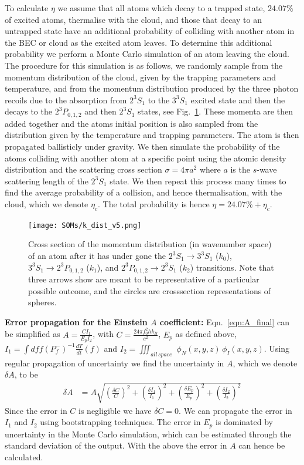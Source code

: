 \documentclass[%
 amsmath,amssymb,
aps,
]{revtex4-2}
\newcommand{\UpperState}{3^{3\!}S_1}%
\newcommand{\MetastableState}{2^{3\!}S_1}%
\newcommand{\MidState}{2^{3\!}P_{0,1,2}}%
\begin{document}
To calculate \(\eta\) we assume that all atoms which decay to a trapped state, \(24.07\%\) of excited atoms, thermalise with the cloud, and those that decay to an untrapped state have an additional probability of colliding with another atom in the BEC or cloud as the excited atom leaves. To determine this additional probability we perform a Monte Carlo simulation of an atom leaving the cloud. The procedure for this simulation is as follows, we randomly sample from the momentum distribution of the cloud, given by the trapping parameters and temperature, and from the momentum distribution produced by the three photon recoils due to the absorption from \(\MetastableState\) to the \(\UpperState\) excited state and then the decays to the \(\MidState\) and then \(\MetastableState\) states, see Fig.~\ref{fig:k_dist}. These momenta are then added together and the atoms initial position is also sampled from the distribution given by the temperature and trapping parameters. The atom is then propagated ballisticly under gravity. We then simulate the probability of the atoms colliding with another atom at a specific point using the atomic density distribution and the scattering cross section \(\sigma = 4 \pi a^2\) where \(a\) is the \(s\)-wave scattering length of the \(\MetastableState\) state. We then repeat this process many times to find the average probability of a collision, and hence thermalisation, with the cloud, which we denote \(\eta_c\). The total probability is hence \(\eta = 24.07\% + \eta_c\).

\begin{figure}
    \centering
    \texttt{[image: SOMs/k\_dist\_v5.png]}
    \caption{Cross section of the momentum distribution (in wavenumber space) of an atom after it has under gone the \(\MetastableState \rightarrow \UpperState\) (\(k_0\)), \(\UpperState \rightarrow \MidState\) (\(k_1\)), and \(\MidState \rightarrow \MetastableState\) (\(k_2\)) transitions. Note that three arrows show are meant to be representative of a particular possible outcome, and the circles are crosssection representations of spheres.}
    \label{fig:k_dist}
\end{figure}

\textbf{Error propagation for the Einstein \(A\) coefficient:} 
Eqn.~\ref{eqn:A_final} can be simplified as \(A=\frac{C I_1}{E_p I_2}\), with \(C=\frac{24 \pi f_0^2 h k_B}{c^2}\), \(E_p\) as defined above, \(I_1 = \int df f \left(P_{f}^-\right)^{-1} \frac{dT}{dt}(f)\) and \(I_2 = \iiint_{all\, space} \,  \, \phi_N(x,y,z) \, \phi_I(x,y,z)\).
Using regular propagation of uncertainty we find the uncertainty in \(A\), which we denote \(\delta A\), to be
\begin{align}
    \delta A &= A \sqrt{\left(\frac{\delta C}{C}\right)^2 + \left(\frac{\delta I_1}{I_1}\right)^2 + \left(\frac{\delta E_p}{E_p}\right)^2 + \left(\frac{\delta I_2}{I_2}\right)^2 }
\end{align}
Since the error in \(C\) is negligible we have \(\delta C =0\). We can propagate the error in \(I_1\) and \(I_2\) using bootstrapping techniques. The error in \(E_p\) is dominated by uncertainty in the Monte Carlo simulation, which can be estimated through the standard deviation of the output. With the above the error in \(A\) can hence be calculated.
\end{document}
